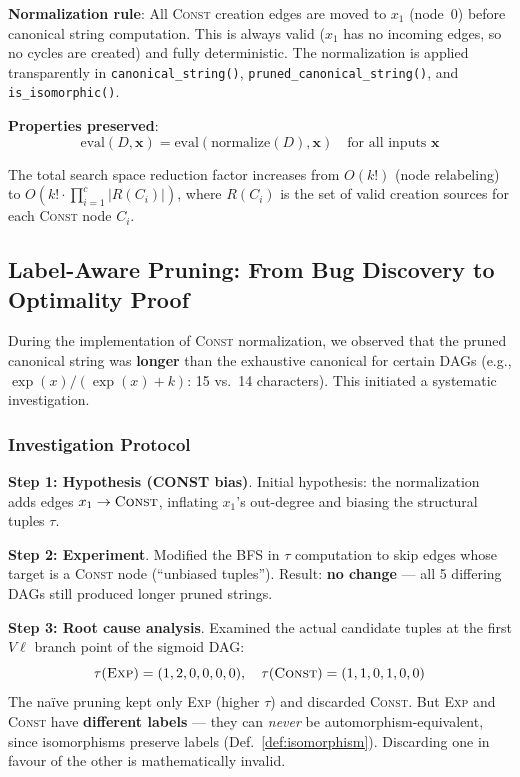 \textbf{Normalization rule}: All \textsc{Const} creation edges are moved to $x_1$
(node~0) before canonical string computation. This is always valid ($x_1$ has no
incoming edges, so no cycles are created) and fully deterministic. The normalization
is applied transparently in \texttt{canonical\_string()},
\texttt{pruned\_canonical\_string()}, and \texttt{is\_isomorphic()}.

\textbf{Properties preserved}:
\[
  \text{eval}(D, \mathbf{x}) = \text{eval}(\text{normalize}(D), \mathbf{x})
  \quad \text{for all inputs } \mathbf{x}
\]

The total search space reduction factor increases from $O(k!)$ (node relabeling)
to $O(k! \cdot \prod_{i=1}^{c} |R(C_i)|)$, where $R(C_i)$ is the set of valid
creation sources for each \textsc{Const} node $C_i$.

\subsection{Label-Aware Pruning: From Bug Discovery to Optimality Proof}

During the implementation of \textsc{Const} normalization, we observed that the
pruned canonical string was \textbf{longer} than the exhaustive canonical for
certain DAGs (e.g., $\exp(x)/(\exp(x)+k)$: 15 vs.\ 14 characters). This initiated
a systematic investigation.

\subsubsection{Investigation Protocol}

\textbf{Step 1: Hypothesis (CONST bias)}. Initial hypothesis: the normalization
adds edges $x_1 \to \textsc{Const}$, inflating $x_1$'s out-degree and biasing the
structural tuples $\tau$.

\textbf{Step 2: Experiment}. Modified the BFS in $\tau$ computation to skip edges
whose target is a \textsc{Const} node (``unbiased tuples''). Result: \textbf{no change}
--- all 5 differing DAGs still produced longer pruned strings.

\textbf{Step 3: Root cause analysis}. Examined the actual candidate tuples at the
first $V\ell$ branch point of the sigmoid DAG:
\[
  \tau(\textsc{Exp}) = (1,2,0,0,0,0), \quad \tau(\textsc{Const}) = (1,1,0,1,0,0)
\]
The na\"ive pruning kept only \textsc{Exp} (higher $\tau$) and discarded
\textsc{Const}. But \textsc{Exp} and \textsc{Const} have \textbf{different labels}
--- they can \textit{never} be automorphism-equivalent, since isomorphisms preserve
labels (Def.~\ref{def:isomorphism}). Discarding one in favour of the other is
mathematically invalid.

